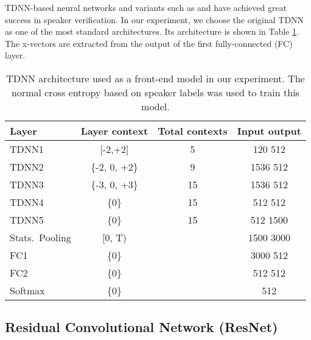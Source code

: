 \documentclass[a4paper]{article}
\begin{document}
TDNN-based neural networks and variants such as \cite{Povey2018-FTDNN} and \cite{Villalba2019-ETDNN} have achieved great success in speaker verification. In our experiment, we choose the original TDNN \cite{Snyder2018-XV} as one of the most standard architectures. Its architecture is shown in Table \ref{tdnn}. The x-vectors are extracted from the output of the first fully-connected (FC) layer.


\setlength{\tabcolsep}{0.9mm}
\begin{table}[t]
\footnotesize
  \caption{TDNN architecture used as a front-end model in our experiment. The normal cross entropy based on speaker labels was used to train this model. }
  \label{tdnn}
  \centering
  \vspace{-2mm}
  \begin{tabular}{l c c c}
    \toprule
    \multicolumn{1}{l}{\textbf{Layer}} & \multicolumn{1}{c}{\textbf{Layer context}} & \multicolumn{1}{c}{\textbf{Total contexts}} & \multicolumn{1}{c}{\textbf{Input  output}}\\
    \midrule
    TDNN1           & [-2,+2]       & 5  & 120    512                          \\
    TDNN2           & \{-2, 0, +2\} & 9  & 1536   512                          \\
    TDNN3           & \{-3, 0, +3\} & 15 & 1536   512                          \\
    TDNN4           & \{0\}         & 15 & 512    512                          \\
    TDNN5           & \{0\}         & 15 & 512    1500                         \\
    Stats.\ Pooling   & [0, T)        &   & 1500  3000                         \\
    FC1             & \{0\}         &   & 3000   512                          \\
    FC2             & \{0\}         &   & 512    512                          \\
    Softmax         & \{0\}         &   & 512                                \\
    \bottomrule
  \end{tabular}
  \vspace{-2mm}
\end{table}


\vspace{-1mm}
\subsection{Residual Convolutional Network (ResNet)}
\end{document}
